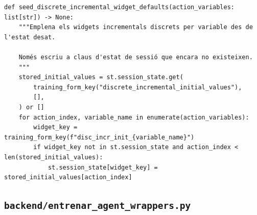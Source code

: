 \documentclass[10pt,a4paper]{article}
\begin{document}
\begin{lstlisting}[style=studioPython,caption={backend/entrenar\_agent\_session.py},label={lst:backend-entrenar-agent-session-py}]
def seed_discrete_incremental_widget_defaults(action_variables: list[str]) -> None:
    """Emplena els widgets incrementals discrets per variable des de l'estat desat.

    Només escriu a claus d'estat de sessió que encara no existeixen.
    """
    stored_initial_values = st.session_state.get(
        training_form_key("discrete_incremental_initial_values"),
        [],
    ) or []
    for action_index, variable_name in enumerate(action_variables):
        widget_key = training_form_key(f"disc_incr_init_{variable_name}")
        if widget_key not in st.session_state and action_index < len(stored_initial_values):
            st.session_state[widget_key] = stored_initial_values[action_index]
\end{lstlisting}


\subsection{\texorpdfstring{\texttt{backend/entrenar\_agent\_wrappers.py}}{backend/entrenar\_agent\_wrappers.py}}
\end{document}
